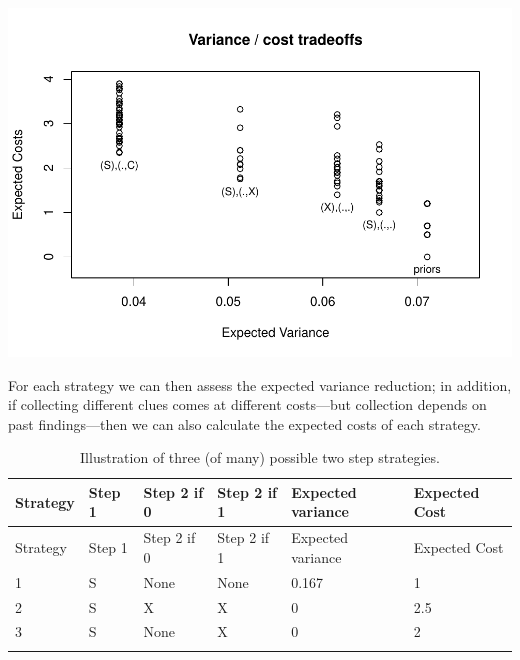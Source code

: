 \documentclass[
  12pt,
]{book}
\newenvironment{Shaded}{\begin{snugshade}}{\end{snugshade}}
\newcommand{\CommentTok}[1]{\textcolor[rgb]{0.56,0.35,0.01}{\textit{#1}}}
\newcommand{\DataTypeTok}[1]{\textcolor[rgb]{0.13,0.29,0.53}{#1}}
\newcommand{\KeywordTok}[1]{\textcolor[rgb]{0.13,0.29,0.53}{\textbf{#1}}}
\newcommand{\NormalTok}[1]{#1}
\newcommand{\OperatorTok}[1]{\textcolor[rgb]{0.81,0.36,0.00}{\textbf{#1}}}
\newcommand{\OtherTok}[1]{\textcolor[rgb]{0.56,0.35,0.01}{#1}}
\newcommand{\StringTok}[1]{\textcolor[rgb]{0.31,0.60,0.02}{#1}}
\begin{document}
\begin{Shaded}
\end{Shaded}

\includegraphics{ii_files/figure-latex/runexam-1.pdf}

For each strategy we can then assess the expected variance reduction; in addition, if collecting different clues comes at different costs---but collection depends on past findings---then we can also calculate the expected costs of each strategy.

\begin{longtable}[]{@{}llllll@{}}
\caption{Illustration of three (of many) possible two step strategies.}\tabularnewline
\toprule
Strategy & Step 1 & Step 2 if 0 & Step 2 if 1 & Expected variance & Expected Cost\tabularnewline
\midrule
\endfirsthead
\toprule
Strategy & Step 1 & Step 2 if 0 & Step 2 if 1 & Expected variance & Expected Cost\tabularnewline
\midrule
\endhead
1 & S & None & None & 0.167 & 1\tabularnewline
2 & S & X & X & 0 & 2.5\tabularnewline
3 & S & None & X & 0 & 2\tabularnewline
& & & & &\tabularnewline
\bottomrule
\end{longtable}
\end{document}
